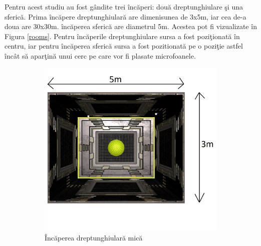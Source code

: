 	Pentru acest studiu au fost g\^{a}ndite trei \^{i}nc\u{a}peri: dou\u{a} dreptunghiulare \c{s}i una sferic\u{a}. Prima \^{i}nc\u{a}pere dreptunghiular\u{a} are dimenisunea de 3x5m, iar cea de-a doua are 30x30m. \^{i}nc\u{a}perea sferic\u{a} are diametrul 5m. Acestea pot fi vizualizate \^{i}n Figura \ref{rooms}. Pentru \^{i}nc\u{a}perile dreptunghiulare sursa a fost pozi\c{t}ionat\u{a} \^{i}n centru, iar pentru \^{i}nc\u{a}perea sferic\u{a} sursa a fost pozitionat\u{a} pe o pozi\c{t}ie astfel \^{i}nc\^{a}t s\u{a} apar\c{t}in\u{a} unui cerc pe care vor fi plasate microfoanele.
	
	\begin{figure}[!htb]%
		\begin{subfigure}[b]{.3\textwidth}
			\centering
			\includegraphics[width=1\linewidth]{imagini/smallRoom.png} 
			\caption{\^{I}nc\u{a}perea dreptunghiular\u{a} mic\u{a}}
		\end{subfigure}
		\hfill
		\begin{subfigure}[b]{.3\textwidth}
			\centering

\end{subfigure}
\end{figure}
